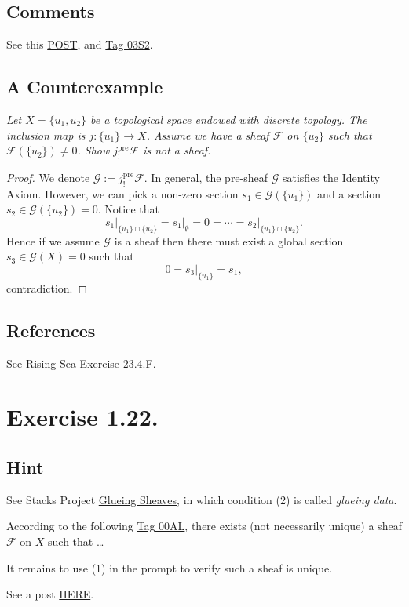 \subsection{Comments}

See this \href{https://math.stackexchange.com/questions/1682362/extension-by-zero-not-quasi-coherent}{POST}, and \href{https://stacks.math.columbia.edu/tag/03S2}{Tag 03S2}.

\subsection{A Counterexample}

\textit{Let $X=\{u_1,u_2\}$ be a topological space endowed with discrete topology. The inclusion map is $j:\{u_1\}\to X$. Assume we have a sheaf $\mathscr F$ on $\{u_2\}$ such that $\mathscr F(\{u_2\})\neq 0$. Show $j_{!}^{\text{pre}}\mathscr F$ is not a sheaf.}

\begin{proof}
    We denote $\mathscr G:=j_{!}^{\text{pre}}\mathscr F$.
    In general, the pre-sheaf $\mathscr G$ satisfies the Identity Axiom. However, we can pick a non-zero section $s_1\in\mathscr G(\{u_1\})$ and a section $s_2\in\mathscr G(\{u_2\})=0$. 
    Notice that 
    \[s_1\vert_{\{u_1\}\cap\{u_2\}}=s_1\vert_{\emptyset}=0=\cdots=s_2\vert_{\{u_1\}\cap\{u_2\}}.\] Hence if we assume $\mathscr G$ is a sheaf then there must exist a global section $s_3\in \mathscr G(X)=0$ such that 
    \[0=s_3\vert_{\{u_1\}}=s_1,\] contradiction.
\end{proof}

\subsection{References}

See Rising Sea \cite{RaviRisingSea} Exercise 23.4.F.

\section{Exercise 1.22.}

\subsection{Hint}
See Stacks Project \href{https://stacks.math.columbia.edu/tag/00AK}{Glueing Sheaves}, in which condition (2) is called \textit{glueing data}. 

According to the following \href{https://stacks.math.columbia.edu/tag/00AL}{Tag 00AL}, there exists (not necessarily unique) a sheaf $\mathscr F$ on $X$ such that \dots

It remains to use (1) in the prompt to verify such a sheaf is unique.

See a post \href{https://math.stackexchange.com/questions/455706/gluing-sheaves-can-we-realize-mathcalfw-as-some-kind-of-limit}{HERE}.